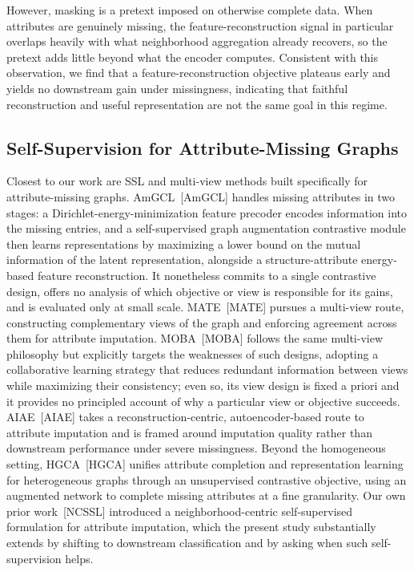 However, masking is a pretext imposed on otherwise complete data. When attributes are genuinely missing, the feature-reconstruction signal in particular overlaps heavily with what neighborhood aggregation already recovers, so the pretext adds little beyond what the encoder computes. Consistent with this observation, we find that a feature-reconstruction objective plateaus early and yields no downstream gain under missingness, indicating that faithful reconstruction and useful representation are not the same goal in this regime.

\subsection{Self-Supervision for Attribute-Missing Graphs}
\label{sec:related-missing}

Closest to our work are SSL and multi-view methods built specifically for attribute-missing graphs. \linebreak AmGCL~[AmGCL] handles missing attributes in two stages: a Dirichlet-energy-minimization feature precoder encodes information into the missing entries, and a self-supervised graph augmentation contrastive module then learns representations by maximizing a lower bound on the mutual information of the latent representation, alongside a structure-attribute energy-based feature reconstruction. It nonetheless commits to a single contrastive design, offers no analysis of which objective or view is responsible for its gains, and is evaluated only at small scale. MATE~[MATE] pursues a multi-view route, constructing complementary views of the graph and enforcing agreement across them for attribute imputation. MOBA~[MOBA] follows the same multi-view philosophy but explicitly targets the weaknesses of such designs, adopting a collaborative learning strategy that reduces redundant information between views while maximizing their consistency; even so, its view design is fixed a priori and it provides no principled account of why a particular view or objective succeeds. AIAE~[AIAE] takes a reconstruction-centric, autoencoder-based route to attribute imputation and is framed around imputation quality rather than downstream performance under severe missingness. Beyond the homogeneous setting, HGCA~[HGCA] unifies attribute completion and representation learning for heterogeneous graphs through an unsupervised contrastive objective, using an augmented network to complete missing attributes at a fine granularity. Our own prior work~[NCSSL] introduced a neighborhood-centric self-supervised formulation for attribute imputation, which the present study substantially extends by shifting to downstream classification and by asking when such self-supervision helps.


